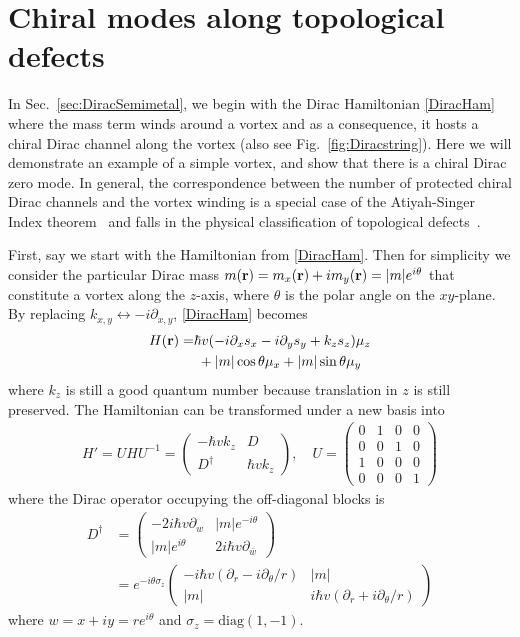 \chapter{Chiral modes along topological defects}\label{sec:chiralmodesapp}
In Sec.~\ref{sec:DiracSemimetal}, we begin with the Dirac Hamiltonian \eqref{DiracHam} where the mass term winds around a vortex and as a consequence, it hosts a chiral Dirac channel along the vortex (also see Fig.~\ref{fig:Diracstring}). Here we will demonstrate an example of a simple vortex, and show that there is a chiral Dirac zero mode. In general, the correspondence between the number of protected chiral Dirac channels and the vortex winding is a special case of the Atiyah-Singer Index theorem~\cite{AtiyahSinger63} and falls in the physical classification of topological defects~\cite{TeoKane}.

First, say we start with the Hamiltonian from \eqref{DiracHam}. Then for simplicity we consider the particular Dirac mass $m({\bf r})=m_x({\bf r})+im_y({\bf r})=|m|e^{i\theta}$ that constitute a vortex along the $z$-axis, where $\theta$ is the polar angle on the $xy$-plane. By replacing $k_{x,y}\leftrightarrow-i\partial_{x,y}$, \eqref{DiracHam} becomes \begin{align}H({\bf r})=&\hbar v(-i\partial_xs_x-i\partial_ys_y+k_zs_z)\mu_z\nonumber\\&\;+|m|\cos\theta\mu_x+|m|\sin\theta\mu_y\label{DiracHamapp}\end{align} where $k_z$ is still a good quantum number because translation in $z$ is still preserved. The Hamiltonian can be transformed under a new basis into \begin{align}H'=UHU^{-1}=\left(\begin{smallmatrix}-\hbar vk_z&D\\D^\dagger&\hbar vk_z\end{smallmatrix}\right),\quad U =\left(\begin{smallmatrix}0&1&0&0\\0&0&1&0\\1&0&0&0\\0&0&0&1\end{smallmatrix}\right)\end{align} where the Dirac operator occupying the off-diagonal blocks is \begin{align}D^\dagger &=\left(\begin{smallmatrix}-2i\hbar v\partial_w&|m|e^{-i\theta}\\|m|e^{i\theta}&2i\hbar v \partial_{\bar{w}}\end{smallmatrix}\right)\nonumber\\&=e^{-i\theta\sigma_z}\left(\begin{smallmatrix}-i\hbar v(\partial_r-i \partial_\theta/r)&|m|\\|m|&i\hbar v(\partial_r+i\partial_\theta/r)\end{smallmatrix}\right)\end{align} where $w=x+iy=re^{i\theta}$ and $\sigma_z=\mathrm{diag}(1,-1)$. 

